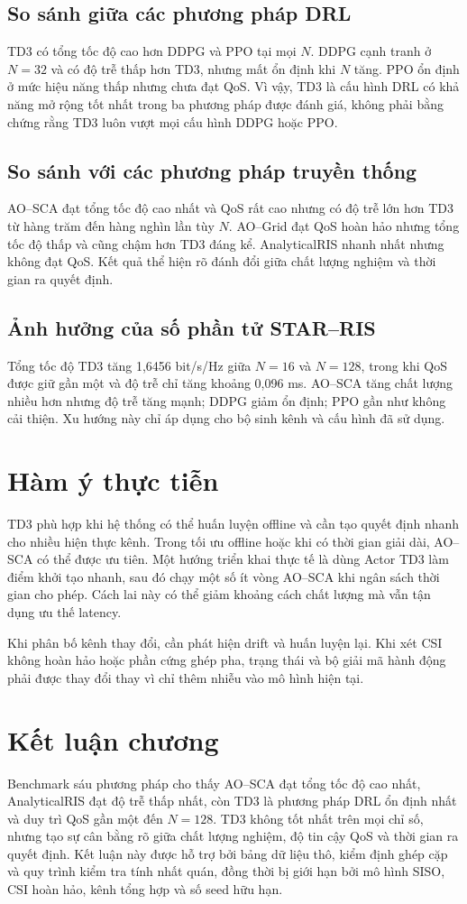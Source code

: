 \subsection{So sánh giữa các phương pháp DRL}
TD3 có tổng tốc độ cao hơn DDPG và PPO tại mọi $N$. DDPG cạnh tranh ở $N=32$ và có độ trễ thấp hơn TD3, nhưng mất ổn định khi $N$ tăng. PPO ổn định ở mức hiệu năng thấp nhưng chưa đạt QoS. Vì vậy, TD3 là cấu hình DRL có khả năng mở rộng tốt nhất trong ba phương pháp được đánh giá, không phải bằng chứng rằng TD3 luôn vượt mọi cấu hình DDPG hoặc PPO.

\subsection{So sánh với các phương pháp truyền thống}
AO--SCA đạt tổng tốc độ cao nhất và QoS rất cao nhưng có độ trễ lớn hơn TD3 từ hàng trăm đến hàng nghìn lần tùy $N$. AO--Grid đạt QoS hoàn hảo nhưng tổng tốc độ thấp và cũng chậm hơn TD3 đáng kể. AnalyticalRIS nhanh nhất nhưng không đạt QoS. Kết quả thể hiện rõ đánh đổi giữa chất lượng nghiệm và thời gian ra quyết định.

\subsection{Ảnh hưởng của số phần tử STAR--RIS}
Tổng tốc độ TD3 tăng 1,6456 bit/s/Hz giữa $N=16$ và $N=128$, trong khi QoS được giữ gần một và độ trễ chỉ tăng khoảng 0,096 ms. AO--SCA tăng chất lượng nhiều hơn nhưng độ trễ tăng mạnh; DDPG giảm ổn định; PPO gần như không cải thiện. Xu hướng này chỉ áp dụng cho bộ sinh kênh và cấu hình đã sử dụng.

\section{Hàm ý thực tiễn}
TD3 phù hợp khi hệ thống có thể huấn luyện offline và cần tạo quyết định nhanh cho nhiều hiện thực kênh. Trong tối ưu offline hoặc khi có thời gian giải dài, AO--SCA có thể được ưu tiên. Một hướng triển khai thực tế là dùng Actor TD3 làm điểm khởi tạo nhanh, sau đó chạy một số ít vòng AO--SCA khi ngân sách thời gian cho phép. Cách lai này có thể giảm khoảng cách chất lượng mà vẫn tận dụng ưu thế latency.

Khi phân bố kênh thay đổi, cần phát hiện drift và huấn luyện lại. Khi xét CSI không hoàn hảo hoặc phần cứng ghép pha, trạng thái và bộ giải mã hành động phải được thay đổi thay vì chỉ thêm nhiễu vào mô hình hiện tại.

\section{Kết luận chương}
Benchmark sáu phương pháp cho thấy AO--SCA đạt tổng tốc độ cao nhất, AnalyticalRIS đạt độ trễ thấp nhất, còn TD3 là phương pháp DRL ổn định nhất và duy trì QoS gần một đến $N=128$. TD3 không tốt nhất trên mọi chỉ số, nhưng tạo sự cân bằng rõ giữa chất lượng nghiệm, độ tin cậy QoS và thời gian ra quyết định. Kết luận này được hỗ trợ bởi bảng dữ liệu thô, kiểm định ghép cặp và quy trình kiểm tra tính nhất quán, đồng thời bị giới hạn bởi mô hình SISO, CSI hoàn hảo, kênh tổng hợp và số seed hữu hạn.
